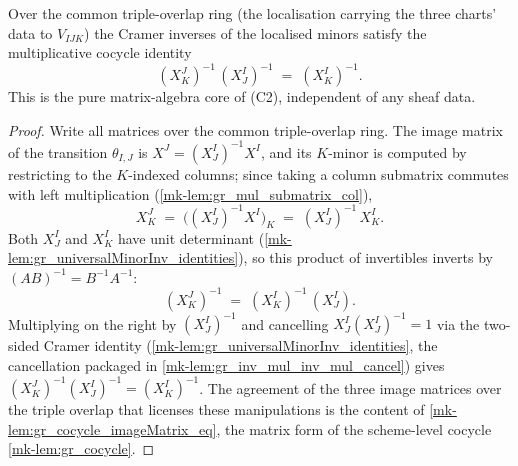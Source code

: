 \begin{lemma}\label{mk-lem:gr_bundleCocycle_matrix}
  \leanok

  Over the common triple-overlap ring (the localisation carrying the three charts'
  data to \(V_{IJK}\)) the Cramer inverses of the localised minors satisfy the
  multiplicative cocycle identity
  \[
    (X^J_K)^{-1}\,(X^I_J)^{-1} \;=\; (X^I_K)^{-1}.
  \]
  This is the pure matrix-algebra core of (C2), independent of any sheaf data.
\end{lemma}
\begin{proof}
  Write all matrices over the common triple-overlap ring. The image matrix of the
  transition \(\theta_{I,J}\) is \(X^J = (X^I_J)^{-1} X^I\), and its \(K\)-minor is
  computed by restricting to the \(K\)-indexed columns; since taking a column
  submatrix commutes with left multiplication (\ref{mk-lem:gr_mul_submatrix_col}),
  \[
    X^J_K \;=\; \bigl((X^I_J)^{-1} X^I\bigr)_K \;=\; (X^I_J)^{-1}\, X^I_K .
  \]
  Both \(X^I_J\) and \(X^I_K\) have unit determinant
  (\ref{mk-lem:gr_universalMinorInv_identities}), so this product of invertibles inverts
  by \((AB)^{-1} = B^{-1} A^{-1}\):
  \[
    (X^J_K)^{-1} \;=\; (X^I_K)^{-1}\,(X^I_J).
  \]
  Multiplying on the right by \((X^I_J)^{-1}\) and cancelling \(X^I_J (X^I_J)^{-1} = 1\)
  via the two-sided Cramer identity (\ref{mk-lem:gr_universalMinorInv_identities}, the
  cancellation packaged in \ref{mk-lem:gr_inv_mul_inv_mul_cancel}) gives
  \((X^J_K)^{-1} (X^I_J)^{-1} = (X^I_K)^{-1}\). The agreement of the three image
  matrices over the triple overlap that licenses these manipulations is the content of
  \ref{mk-lem:gr_cocycle_imageMatrix_eq}, the matrix form of the scheme-level cocycle
  \ref{mk-lem:gr_cocycle}.
\end{proof}

